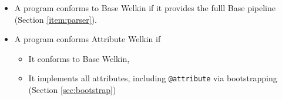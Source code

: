 \begin{itemize}
\begin{itemize}

\item A program conforms to Base Welkin if it provides the fulll Base pipeline (Section \ref{item:parser}).

\item A program conforms Attribute Welkin if
\begin{itemize}
  \item It conforms to Base Welkin,
  \item It implements all attributes, including \texttt{@attribute} via bootstrapping (Section \ref{sec:bootstrap})
\end{itemize}


\end{itemize}



\end{itemize}
